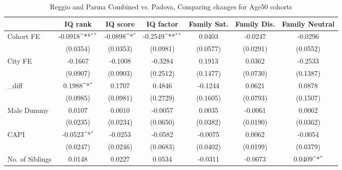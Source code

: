\begin{table}[htbp]\centering
\def\sym#1{\ifmmode^{#1}\else\(^{#1}\)\fi}
\caption{Reggio and Parma Combined vs. Padova, Comparing changes for Age50 cohorts}
\begin{tabular}{l*{6}{c}}
\toprule
            &\multicolumn{1}{c}{IQ rank}&\multicolumn{1}{c}{IQ score}&\multicolumn{1}{c}{IQ factor}&\multicolumn{1}{c}{Family Sat.}&\multicolumn{1}{c}{Family Dis.}&\multicolumn{1}{c}{Family Neutral}\\
\midrule
Cohort FE   &     -0.0918\sym{**} &     -0.0898\sym{*}  &     -0.2549\sym{**} &      0.0403         &     -0.0247         &     -0.0296         \\
            &    (0.0354)         &    (0.0353)         &    (0.0981)         &    (0.0577)         &    (0.0291)         &    (0.0552)         \\
\addlinespace
City FE     &     -0.1667         &     -0.1008         &     -0.3284         &      0.1913         &      0.0362         &     -0.2533         \\
            &    (0.0907)         &    (0.0903)         &    (0.2512)         &    (0.1477)         &    (0.0730)         &    (0.1387)         \\
\addlinespace
\_diff       &      0.1988\sym{*}  &      0.1707         &      0.4846         &     -0.1244         &      0.0621         &      0.0878         \\
            &    (0.0985)         &    (0.0981)         &    (0.2729)         &    (0.1605)         &    (0.0793)         &    (0.1507)         \\
\addlinespace
Male Dummy  &      0.0107         &      0.0010         &     -0.0057         &      0.0035         &     -0.0061         &      0.0062         \\
            &    (0.0235)         &    (0.0234)         &    (0.0650)         &    (0.0382)         &    (0.0190)         &    (0.0362)         \\
\addlinespace
CAPI        &     -0.0523\sym{*}  &     -0.0253         &     -0.0582         &     -0.0075         &      0.0062         &     -0.0054         \\
            &    (0.0247)         &    (0.0246)         &    (0.0683)         &    (0.0402)         &    (0.0199)         &    (0.0379)         \\
\addlinespace
No. of Siblings&      0.0148         &      0.0227         &      0.0534         &     -0.0311         &     -0.0073         &      0.0409\sym{*}  \\

\end{tabular}
\end{table}

